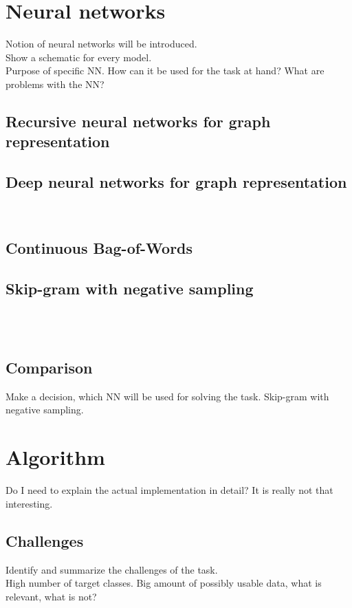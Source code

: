 \documentclass{scrartcl} %
\begin{document}
\section{Neural networks}
Notion of neural networks will be introduced.\\
Show a schematic for every model.\\
Purpose of specific NN. How can it be used for the task at hand? What are problems with the NN?

\subsection{Recursive neural networks for graph representation}
\citeauthor{Scarselli2009} \cite{Scarselli2009}
\subsection{Deep neural networks for graph representation}
\citeauthor{Cao2016} \cite{Cao2016} \\
\citeauthor{Raghu2016} \cite{Raghu2016}
\subsection{Continuous Bag-of-Words}
\citeauthor{Mikolov2013} \cite{Mikolov2013}
\subsection{Skip-gram with negative sampling}
\citeauthor{Mikolov2013} \cite{Mikolov2013}\\
\citeauthor{Levy2015} \cite{Levy2015}\\
\citeauthor{Goldberg14} \cite{Goldberg14}

\subsection{Comparison}
Make a decision, which NN will be used for solving the task. Skip-gram with negative sampling.

\section{Algorithm}
Do I need to explain the actual implementation in detail? It is really not that interesting.

\subsection{Challenges}
Identify and summarize the challenges of the task.\\
High number of target classes. Big amount of possibly usable data, what is relevant, what is not?
\end{document}
